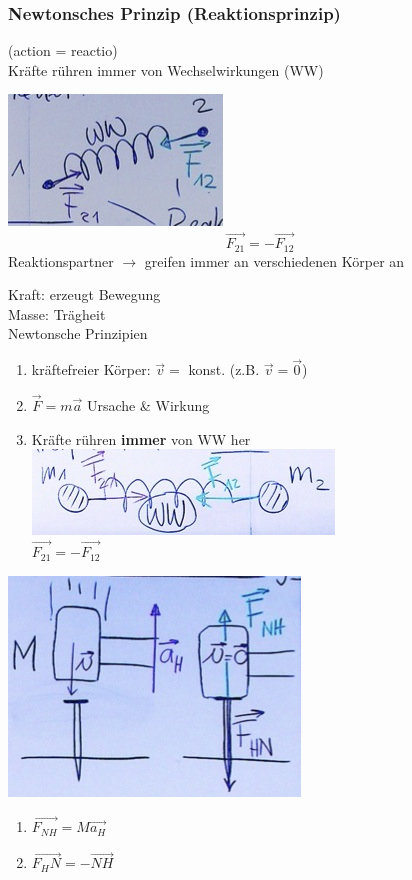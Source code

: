 \subsubsection{Newtonsches Prinzip (Reaktionsprinzip)}
(action = reactio) \\
Kräfte rühren immer von Wechselwirkungen (WW)
\begin{bsp*}[note = Feder]
	\includegraphics{Bild20}
	\[ \vec{F_{21}} = -\vec{F_{12}} \]
	Reaktionspartner $\rightarrow$ greifen immer an verschiedenen Körper an
\end{bsp*}
\begin{rep*}[ note = Dynamik ]
	Kraft: erzeugt Bewegung \\
	Masse: Trägheit \\
	Newtonsche Prinzipien \\
	\begin{enumerate}
		\item kräftefreier Körper: $\vec{v} =$ konst. (z.B. $\vec{v} = \vec{0}$)
		\item $\vec{F} = m \vec{a}$ Ursache \& Wirkung
		\item Kräfte rühren \textbf{immer} von WW her \\
			\includegraphics{Bild21} \\
			$\vec{F_{21}} = -\vec{F_12}$
	\end{enumerate}
\end{rep*}
\begin{bsp*}[ note = Hammer \& Nagel ]
	\includegraphics{Bild22}
	\begin{enumerate}[start = 2]
		\item $\vec{F_{NH}} = M \vec{a_H}$
		\item $\vec{F_HN} = -\vec{NH}$
	\end{enumerate}
\end{bsp*}

